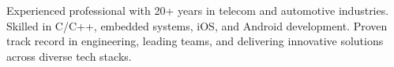 

\begin{cvparagraph}

Experienced professional with 20+ years in telecom and automotive industries. Skilled in C/C++, embedded systems, iOS, and Android development. Proven track record in engineering, leading teams, and delivering innovative solutions across diverse tech stacks.
\end{cvparagraph}
